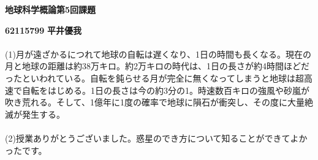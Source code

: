 \documentclass[a4paper,10.5pt]{ltjsarticle}
\begin{document}
\centerline
{\huge \bfseries 地球科学概論第5回課題}
\leftline
{\bfseries 62115799}
{\bfseries 平井優我}\\
\\
(1)月が遠ざかるにつれて地球の自転は遅くなり、1日の時間も長くなる。現在の月と地球の距離は約38万キロ。約2万キロの時代は、1日の長さが約4時間ほどだったといわれている。自転を鈍らせる月が完全に無くなってしまうと地球は超高速で自転をはじめる。1日の長さは今の約3分の1。時速数百キロの強風や砂嵐が吹き荒れる。そして、1億年に1度の確率で地球に隕石が衝突し、その度に大量絶滅が発生する。
\\
\\
(2)授業ありがとうございました。惑星のでき方について知ることができてよかったです。
\end{document}
